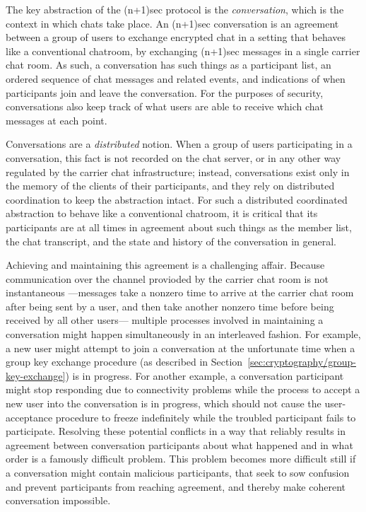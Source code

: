 \documentclass{article}
\begin{document}
The key abstraction of the (n+1)sec protocol is the \emph{conversation}, which is the context in which chats take place.
An (n+1)sec conversation is an agreement between a group of users to exchange encrypted chat in a setting that behaves like a conventional chatroom, by exchanging (n+1)sec messages in a single carrier chat room.
As such, a conversation has such things as a participant list, an ordered sequence of chat messages and related events, and indications of when participants join and leave the conversation.
For the purposes of security, conversations also keep track of what users are able to receive which chat messages at each point.

Conversations are a \emph{distributed} notion.
When a group of users participating in a conversation, this fact is not recorded on the chat server, or in any other way regulated by the carrier chat infrastructure; instead, conversations exist only in the memory of the clients of their participants, and they rely on distributed coordination to keep the abstraction intact.
For such a distributed coordinated abstraction to behave like a conventional chatroom, it is critical that its participants are at all times in agreement about such things as the member list, the chat transcript, and the state and history of the conversation in general.

Achieving and maintaining this agreement is a challenging affair.
Because communication over the channel provioded by the carrier chat room is not instantaneous ---messages take a nonzero time to arrive at the carrier chat room after being sent by a user, and then take another nonzero time before being received by all other users--- multiple processes involved in maintaining a conversation might happen simultaneously in an interleaved fashion.
For example, a new user might attempt to join a conversation at the unfortunate time when a group key exchange procedure (as described in Section~\ref{sec:cryptography/group-key-exchange}) is in progress.
For another example, a conversation participant might stop responding due to connectivity problems while the process to accept a new user into the conversation is in progress, which should not cause the user-acceptance procedure to freeze indefinitely while the troubled participant fails to participate.
Resolving these potential conflicts in a way that reliably results in agreement between conversation participants about what happened and in what order is a famously difficult problem.
This problem becomes more difficult still if a conversation might contain malicious participants, that seek to sow confusion and prevent participants from reaching agreement, and thereby make coherent conversation impossible.
\end{document}
